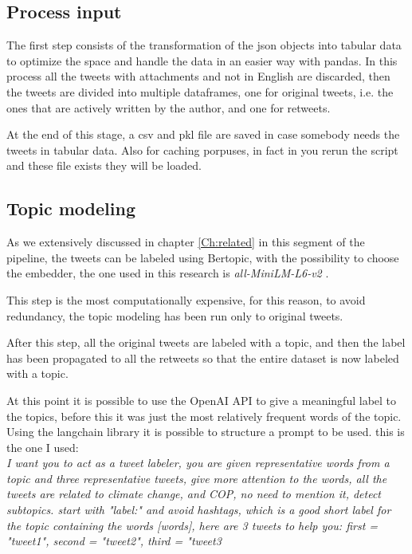 \subsection{Process input}

The first step consists of the transformation of the json objects into tabular data to optimize the space and handle the data in an easier way with pandas. In this process all the tweets with attachments and not in English are discarded, then the tweets are divided into multiple dataframes, one for original tweets, i.e. the ones that are actively written by the author, and one for retweets.

At the end of this stage, a csv and pkl file are saved in case somebody needs the tweets in tabular data. Also for caching porpuses, in fact in you rerun the script and these file exists they will be loaded.

\subsection{Topic modeling}

As we extensively discussed in chapter \ref{Ch:related} in this segment of the pipeline, the tweets can be labeled using Bertopic, with the possibility to choose the embedder, the one used in this research is \textit{all-MiniLM-L6-v2} .

This step is the most computationally expensive, for this reason, to avoid redundancy, the topic modeling has been run only to original tweets. 

After this step, all the original tweets are labeled with a topic, and then the label has been propagated to all the retweets so that the entire dataset is now labeled with a topic.

At this point it is possible to use the OpenAI API to give a meaningful label to the topics, before this it was just the most relatively frequent words of the topic. Using the langchain library it is possible to structure a prompt to be used. this is the one I used: 
\\

\textit{    I want you to act as a tweet labeler, you are given representative words
from a topic and three representative tweets, give more attention to the words, all the tweets are related to climate change, and COP, no need to mention it, detect subtopics.
start with "label:" and avoid hashtags,
which is a good short label for the topic containing the words [{words}], here are 3 tweets to help you:
first = "{tweet1}", second = "{tweet2}", third = "{tweet3}}
\\

